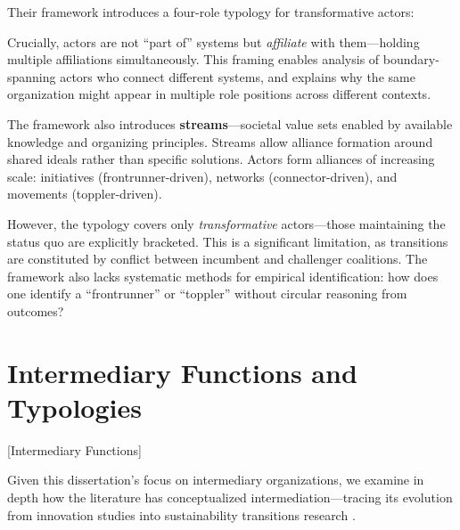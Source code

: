 \documentclass[../main.tex]{subfiles}
\begin{document}
Their framework introduces a four-role typology for transformative actors:


Crucially, actors are not ``part of'' systems but \textit{affiliate} with them---holding multiple affiliations simultaneously. This framing enables analysis of boundary-spanning actors who connect different systems, and explains why the same organization might appear in multiple role positions across different contexts.

The framework also introduces \textbf{streams}---societal value sets enabled by available knowledge and organizing principles. Streams allow alliance formation around shared ideals rather than specific solutions. Actors form alliances of increasing scale: initiatives (frontrunner-driven), networks (connector-driven), and movements (toppler-driven).

However, the typology covers only \textit{transformative} actors---those maintaining the status quo are explicitly bracketed. This is a significant limitation, as transitions are constituted by conflict between incumbent and challenger coalitions. The framework also lacks systematic methods for empirical identification: how does one identify a ``frontrunner'' or ``toppler'' without circular reasoning from outcomes?


\section{Intermediary Functions and Typologies}[Intermediary Functions]

Given this dissertation's focus on intermediary organizations, we examine in depth how the literature has conceptualized intermediation---tracing its evolution from innovation studies into sustainability transitions research \cite{vanlente2020intermediaries}.
\end{document}
